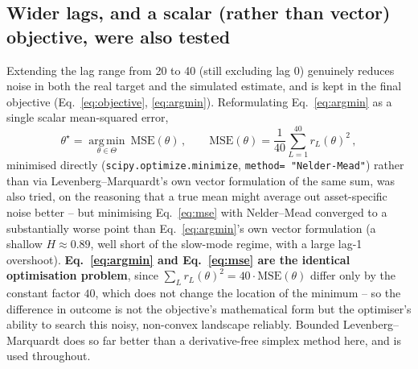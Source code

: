 \documentclass[11pt]{article}
\begin{document}
\subsection{Wider lags, and a scalar (rather than vector) objective, were also tested}
\label{sec:widelags}
Extending the lag range from 20 to 40 (still excluding lag 0) genuinely
reduces noise in both the real target and the simulated estimate, and is
kept in the final objective (Eq.~\ref{eq:objective}, \ref{eq:argmin}).
Reformulating Eq.~\ref{eq:argmin} as a single scalar mean-squared error,
\begin{equation}
\theta^\star = \operatorname*{arg\,min}_{\theta\in\Theta}\ 
\text{MSE}(\theta)\, ,\qquad
\text{MSE}(\theta) = \frac{1}{40}\sum_{L=1}^{40} r_L(\theta)^2\, ,
\label{eq:mse}
\end{equation}
minimised directly (\texttt{scipy.optimize.minimize}, \texttt{method=
"Nelder-Mead"}) rather than via Levenberg--Marquardt's own vector
formulation of the same sum, was also tried, on the reasoning that a true
mean might average out asset-specific noise better -- but minimising
Eq.~\ref{eq:mse} with Nelder--Mead converged to a substantially worse point
than Eq.~\ref{eq:argmin}'s own vector formulation (a shallow $H\approx0.89$,
well short of the slow-mode regime, with a large lag-1 overshoot).
\textbf{Eq.~\ref{eq:argmin} and Eq.~\ref{eq:mse} are the identical
optimisation problem}, since $\sum_L r_L(\theta)^2 = 40\cdot\text{MSE}(\theta)$
differ only by the constant factor $40$, which does not change the location
of the minimum -- so the difference in outcome is not the objective's
mathematical form but the optimiser's ability to search this noisy,
non-convex landscape reliably. Bounded Levenberg--Marquardt does so far
better than a derivative-free simplex method here, and is used throughout.
\end{document}
